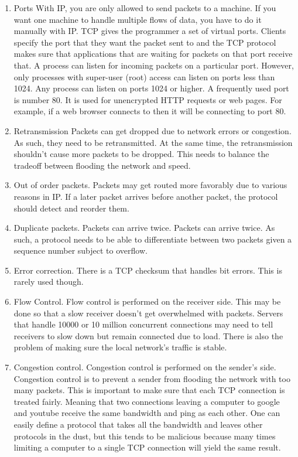 \begin{enumerate}
  \item Ports
  With IP, you are only allowed to send packets to a machine.
  If you want one machine to handle multiple flows of data, you have to do it manually with IP.
  TCP gives the programmer a set of virtual ports.
  Clients specify the port that they want the packet sent to and the TCP protocol makes sure that applications that are waiting for packets on that port receive that.
  A process can listen for incoming packets on a particular port.
  However, only processes with super-user (root) access can listen on ports less than 1024.
  Any process can listen on ports 1024 or higher.
  A frequently used port is number 80.
  It is used for unencrypted HTTP requests or web pages.
  For example, if a web browser connects to  then it will be connecting to port 80.

\item Retransmission
  Packets can get dropped due to network errors or congestion.
  As such, they need to be retransmitted.
  At the same time, the retransmission shouldn't cause more packets to be dropped.
  This needs to balance the tradeoff between flooding the network and speed.

\item Out of order packets.
  Packets may get routed more favorably due to various reasons in IP.
  If a later packet arrives before another packet, the protocol should detect and reorder them.

\item Duplicate packets.
  Packets can arrive twice.
  Packets can arrive twice.
  As such, a protocol needs to be able to differentiate between two packets given a sequence number subject to overflow.

\item Error correction.
  There is a TCP checksum that handles bit errors.
  This is rarely used though.

\item Flow Control.
  Flow control is performed on the receiver side.
  This may be done so that a slow receiver doesn't get overwhelmed with packets.
  Servers that handle 10000 or 10 million concurrent connections may need to tell receivers to slow down but remain connected due to load.
  There is also the problem of making sure the local network's traffic is stable.

\item Congestion control.
  Congestion control is performed on the sender's side.
  Congestion control is to prevent a sender from flooding the network with too many packets.
  This is important to make sure that each TCP connection is treated fairly.
  Meaning that two connections leaving a computer to google and youtube receive the same bandwidth and ping as each other.
  One can easily define a protocol that takes all the bandwidth and leaves other protocols in the dust, but this tends to be malicious because many times limiting a computer to a single TCP connection will yield the same result.


\end{enumerate}
